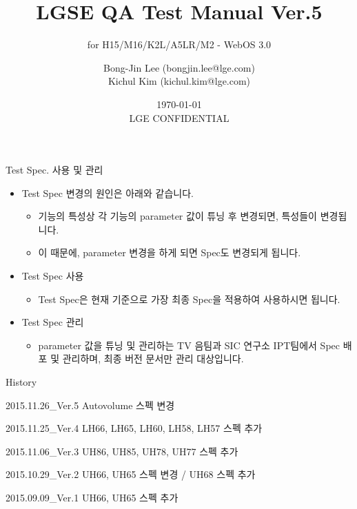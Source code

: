 \documentclass{beamer}
\title[WebOS 3.0 QA spec \alert{LGE CONFIDENTIAL}] %
{LGSE QA Test Manual Ver.5}
\subtitle
{for H15/M16/K2L/A5LR/M2 - WebOS 3.0} %
\author[Bong-Jin Lee, Kichul Kim] %
{Bong-Jin Lee (bongjin.lee@lge.com)\\Kichul Kim (kichul.kim@lge.com)}
\institute[IPT team, SIC lab., LG Electronics] %
{
  IPT team, SIC lab., LG Electronics \\
  Release Link: (http://collab.lge.com/main/x/0hVwG)
  }
\date[Short Occasion] %
{\today\\ \alert{LGE CONFIDENTIAL}}
\begin{document}
\begin{frame}
  \titlepage
\end{frame}


\begin{frame}[t]{Test Spec. 사용 및 관리}

 \begin{itemize}
 \item Test Spec 변경의 원인은 아래와 같습니다.
 	\begin{itemize}
	\item 기능의 특성상 각 기능의 parameter 값이 튜닝 후 변경되면, 특성들이 변경됩니다.
	\item 이 때문에, parameter 변경을 하게 되면 Spec도 변경되게 됩니다.
	\end{itemize}
\end{itemize}

 \begin{itemize}
 \item Test Spec 사용
 	\begin{itemize}
 	\item Test Spec은 현재 기준으로 가장 최종 Spec을 적용하여 사용하시면 됩니다.
	\end{itemize}
\end{itemize}

 \begin{itemize}
 \item Test Spec 관리
 	\begin{itemize}
 	\item parameter 값을 튜닝 및 관리하는 TV 음팀과 SIC 연구소 IPT팀에서 Spec 배포 및 관리하며, 최종 버전 문서만 관리 대상입니다.
	\end{itemize}
\end{itemize}

\end{frame}

\begin{frame}[t]{History}
\begin{itemize}
\begin{scriptsize}
\item 2015.11.26\_Ver.5 Autovolume 스펙 변경
\item 2015.11.25\_Ver.4 LH66, LH65, LH60, LH58, LH57 스펙 추가
\item 2015.11.06\_Ver.3 UH86, UH85, UH78, UH77 스펙 추가
\item 2015.10.29\_Ver.2 UH66, UH65 스펙 변경 / UH68 스펙 추가
\item 2015.09.09\_Ver.1 UH66, UH65 스펙 추가
\end{scriptsize}
\end{itemize}
\end{frame}
\end{document}
